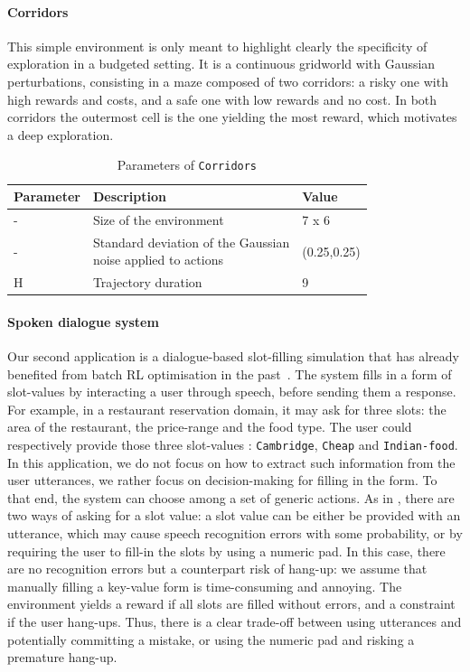 \paragraph{Corridors}
This simple environment is only meant to highlight clearly the specificity of exploration in a budgeted setting. It is a continuous gridworld with Gaussian perturbations, consisting in a maze composed of two corridors: a risky one with high rewards and costs, and a safe one with low rewards and no cost. In both corridors the outermost cell is the one yielding the most reward, which motivates a deep exploration.

\begin{table}[ht!]
    \centering
    \begin{tabular}{lll}
        \toprule
        Parameter & Description & Value\tabularnewline
        \midrule
        - & Size of the environment & 7 x 6\tabularnewline
        - & \makecell[l]{Standard deviation of the Gaussian \\noise applied to actions} & (0.25,0.25)\tabularnewline
        H & Trajectory duration & 9\tabularnewline
        \bottomrule
    \end{tabular}
    \caption{Parameters of \texttt{Corridors}}
    \label{tab:param-corridors}
\end{table}

\paragraph{Spoken dialogue system}
Our second application is a dialogue-based slot-filling simulation that has already benefited from batch RL optimisation in the past~\citep{Li2009ReinforcementLF,chandramohan2010optimizing,pietquin2011sample}. The system fills in a form of slot-values by interacting a user through speech, before sending them a response. For example, in a restaurant reservation domain, it may ask for three slots: the area of the restaurant, the price-range and the food type. The user could respectively provide those three slot-values : \texttt{Cambridge}, \texttt{Cheap} and \texttt{Indian-food}. In this application, we do not focus on how to extract such information from the user utterances, we rather focus on decision-making for filling in the form. To that end, the system can choose among a set of generic actions. As in \citep{carrara2018safe}, there are two ways of asking for a slot value: a slot value can be either be provided with an utterance, which may cause speech recognition errors with some probability, or by requiring the user to fill-in the slots by using a numeric pad. In this case, there are no recognition errors but a counterpart risk of hang-up: we assume that manually filling a key-value form is time-consuming and annoying. The environment yields a reward if all slots are filled without errors, and a constraint if the user hang-ups. Thus, there is a clear trade-off between using utterances and potentially committing a mistake, or using the numeric pad and risking a premature hang-up.

